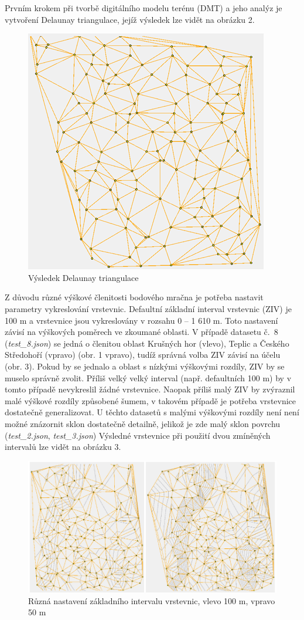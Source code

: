 \documentclass{article}
\begin{document}
\begin{spacing}{1.5}
Prvním krokem při tvorbě digitálního modelu terénu (DMT) a jeho analýz je vytvoření Delaunay triangulace, jejíž výsledek lze vidět na obrázku 2.

\begin{figure}[h]
    \centering
    \includegraphics[width=0.45\linewidth]{images/02triangulace.png}
    \caption{Výsledek Delaunay triangulace}
    \label{fig:enter-label}
\end{figure}

\newpage
Z důvodu různé výškové členitosti bodového mračna je potřeba nastavit parametry vykreslování vrstevnic. Defaultní základní interval vrstevnic (ZIV) je 100 m a vrstevnice jsou vykreslovány v rozsahu 0 – 1 610 m. Toto nastavení závisí na výškových poměrech ve zkoumané oblasti. V případě datasetu č.~8 (\textit{test\_8.json}) se jedná o členitou oblast Krušných hor (vlevo), Teplic a Českého Středohoří (vpravo) (obr. 1 vpravo), tudíž správná volba ZIV závisí na účelu (obr. 3). Pokud by se jednalo a oblast s nízkými výškovými rozdíly, ZIV by se muselo správně zvolit. Příliš velký velký interval (např. defaultních 100 m) by v tomto případě nevykreslil žádné vrstevnice. Naopak příliš malý ZIV by zvýraznil malé výškové rozdíly způsobené šumem, v takovém případě je potřeba vrstevnice dostatečně generalizovat. U těchto datasetů s malými výškovými rozdíly není není možné znázornit sklon dostatečně detailně, jelikož je zde malý sklon povrchu (\textit{test\_2.json}, \textit{test\_3.json}) Výsledné vrstevnice při použití dvou zmíněných intervalů lze vidět na obrázku 3.

\begin{figure}[htbp]
    \centering
    \includegraphics[width=0.8\linewidth]{images/03vrstevnice.png}
    \caption{Různá nastavení základního intervalu vrstevnic, vlevo 100 m, vpravo 50 m}
    \label{fig:enter-label}
\end{figure}


\end{spacing}
\end{document}
